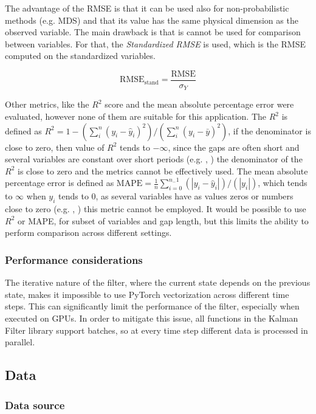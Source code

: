 \documentclass{article}
\let\Oldsubsection\subsection
\renewcommand{\subsection}{\FloatBarrier\Oldsubsection}
\begin{document}
The advantage of the RMSE is that it can be used also for non-probabilistic methods (e.g. MDS) and that its value has the same physical dimension as the observed variable. The main drawback is that is cannot be used for comparison between variables. For that, the \emph{Standardized RMSE} is used, which is the RMSE computed on the standardized variables.

\begin{equation}
    \text{RMSE}_{\text{stand}} = \frac{\text{RMSE}}{\sigma_Y} 
\end{equation}

Other metrics, like the $R^2$ score and the mean absolute percentage error were evaluated, however none of them are suitable for this application. The $R^2$ is defined as $R^2 = 1 - (\sum_{i}^{n} (y_i - \hat{y}_i)^2)/(\sum_{i}^{n} (y_i - \bar{y})^2)$, if the denominator is close to zero, then value of $R^2$ tends to $- \infty$, since the gaps are often short and several variables are constant over short periods (e.g. , ) the denominator of the $R^2$ is close to zero and the metrics cannot be effectively used. The mean absolute percentage error is defined as $\text{MAPE} = \frac{1}{n} \sum_{i=0}^{n_-1} (\left| y_i - \hat{y}_i \right|)/(\left| y_i \right|)$, which tends to $\infty$ when $y_i$ tends to 0, as several variables have as values zeros or numbers close to zero (e.g. , ) this metric cannot be employed.
It would be possible to use $R^2$ or MAPE, for subset of variables and gap length, but this limits the ability to perform comparison across different settings. 

\subsubsection{Performance considerations} 

The iterative nature of the filter, where the current state depends on the previous state, makes it impossible to use PyTorch vectorization across different time steps. This can significantly limit the performance of the filter, especially when executed on GPUs. In order to  mitigate this issue, all functions in the Kalman Filter library support batches, so at every time step different data is processed in parallel.


\subsection{Data}

\subsubsection{Data source}
\end{document}
